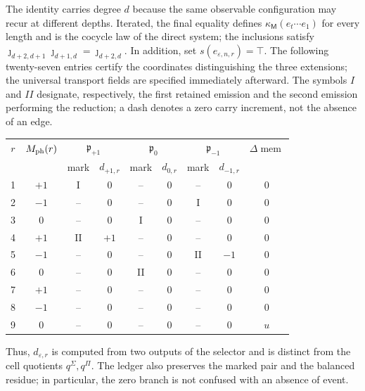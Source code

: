 The identity carries degree \(d\) because the same observable configuration
may recur at different depths. Iterated, the final equality defines
\(\kappa_{\mathsf M}(e_t\cdots e_1)\) for every length and is the cocycle law
of the direct system; the inclusions satisfy
\(\jmath_{d+2,d+1}\jmath_{d+1,d}=\jmath_{d+2,d}\).
In addition, set \(s(e_{\varepsilon,n,r})=\top\). The following twenty-seven
entries certify the coordinates distinguishing the three extensions; the
universal transport fields are specified immediately afterward. The symbols
\(I\) and \(II\) designate, respectively, the first retained emission and the
second emission performing the reduction; a dash denotes a zero carry
increment, not the absence of an edge.
\begin{center}
\small
\setlength{\tabcolsep}{3.2pt}
\begin{tabular}{c c cc cc cc c}
\toprule
\(r\)&\(M_{\rm ph}(r)\)&\multicolumn{2}{c}{\(\mathfrak p_{+1}\)}&
\multicolumn{2}{c}{\(\mathfrak p_0\)}&
\multicolumn{2}{c}{\(\mathfrak p_{-1}\)}&
\(\Delta\operatorname{mem}\)\\
& &mark&\(d_{+1,r}\)&mark&\(d_{0,r}\)&mark&\(d_{-1,r}\)&\\
\midrule
1&\(+1\)&I&0&--&0&--&0&0\\
2&\(-1\)&--&0&--&0&I&0&0\\
3&0&--&0&I&0&--&0&0\\
4&\(+1\)&II&\(+1\)&--&0&--&0&0\\
5&\(-1\)&--&0&--&0&II&\(-1\)&0\\
6&0&--&0&II&0&--&0&0\\
7&\(+1\)&--&0&--&0&--&0&0\\
8&\(-1\)&--&0&--&0&--&0&0\\
9&0&--&0&--&0&--&0&\(u\)\\
\bottomrule
\end{tabular}
\end{center}
Thus, \(d_{\varepsilon,r}\) is computed from two outputs of the selector and
is distinct from the cell quotients \(q^\Sigma,q^\Pi\). The ledger also
preserves the marked pair and the balanced residue; in particular, the zero
branch is not confused with an absence of event.

